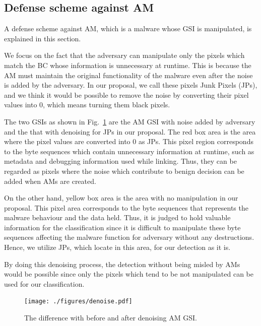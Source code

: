 \documentclass{ieeeaccess}
\newcommand{\myfigurename}{Fig.}
\begin{document}
\subsection{Defense scheme against AM}
A defense scheme against AM, which is a malware whose GSI is manipulated, is explained in this section.

We focus on the fact that the adversary can manipulate only the pixels which match the BC whose information is unnecessary at runtime.
This is because the AM must maintain the original functionality of the malware even after the noise is added by the adversary.
In our proposal, we call these pixels Junk Pixels (JPs), and we think it would be possible to remove the noise by converting their pixel values into 0, which means turning them black pixels.

The two GSIs as shown in \myfigurename~\ref{fig:denoise} are the AM GSI with noise added by adversary and the that with denoising for JPs in our proposal.
The red box area is the area where the pixel values are converted into 0 as JPs.
This pixel region corresponds to the byte sequences which contain unnecessary information at runtime, such as metadata and debugging information used while linking.
Thus, they can be regarded as pixels where the noise which contribute to benign decision can be added when AMs are created.

On the other hand, yellow box area is the area with no manipulation in our proposal.
This pixel area corresponds to the byte sequences that represents the malware behaviour and the data held.
Thus, it is judged to hold valuable information for the classification since it is difficult to manipulate these byte sequences affecting the malware function for adversary without any destructions.
Hence, we utilize JPs, which locate in this area, for our detection as it is.

By doing this denoising process, the detection without being misled by AMs would be possible since only the pixels which tend to be not manipulated can be used for our classification.

\begin{figure}[t]
 \centering
 \texttt{[image: ./figures/denoise.pdf]}
 \caption{The difference with before and after denoising AM GSI.} 
 \label{fig:denoise}
\end{figure}
\end{document}
